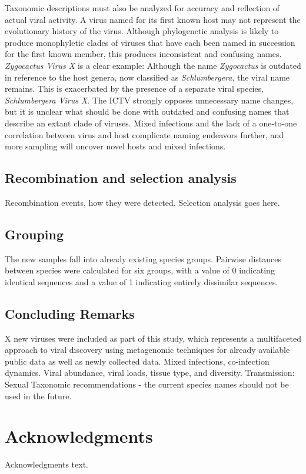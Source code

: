 \documentclass[11pt,letterpaper,titlepage]{article}
\begin{document}
\begin{linenumbers}
Taxonomic descriptions must also be analyzed for accuracy and reflection of actual viral activity. 
A virus named for its first known host may not represent the evolutionary history of the virus.
Although phylogenetic analysis is likely to produce monophyletic clades of viruses that have each been named in succession for the first known member, this produces inconsistent and confusing names.
\textit{Zygocactus Virus X} is a clear example: Although the name \textit{Zygocactus} is outdated in reference to the host genera, now classified as \textit{Schlumbergera}, the viral name remains.
This is exacerbated by the presence of a separate viral species, \textit{Schlumbergera Virus X}.
The ICTV strongly opposes unnecessary name changes, but it is unclear what should be done with outdated and confusing names that describe an extant clade of viruses.
Mixed infections and the lack of a one-to-one correlation between virus and host complicate naming endeavors further, and more sampling will uncover novel hosts and mixed infections.

\subsection*{Recombination and selection analysis}
Recombination events, how they were detected.
Selection analysis goes here.

\subsection*{Grouping}
The new samples fall into already existing species groups.
Pairwise distances between species were calculated for six groups, with a value of 0 indicating identical sequences and a value of 1 indicating entirely dissimilar sequences.

\subsection*{Concluding Remarks}
X new viruses were included as part of this study, which represents a multifaceted approach to viral discovery using metagenomic techniques for already available public data as well as newly collected data.
Mixed infections, co-infection dynamics.
Viral abundance, viral loads, tissue type, and diversity.
Transmission: Sexual
Taxonomic recommendations - the current species names should not be used in the future.
\section*{Acknowledgments}

Acknowledgments text.

\pagebreak
\raggedright{}
\setlength{\parindent}{0.0in}


\end{linenumbers}
\end{document}
